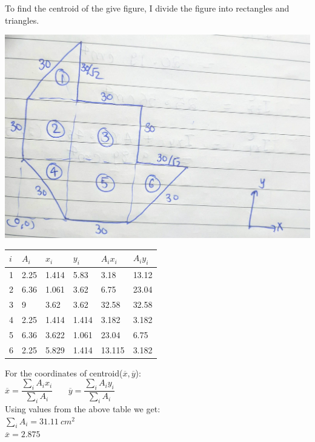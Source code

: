 \documentclass{article}
\begin{document}
To find the centroid of the give figure, I divide the figure into rectangles and triangles.\\
\begin{center}
\includegraphics[scale=0.1]{Q1.jpg}
\bigbreak

\begin{tabular}{ | m{1cm} | m{1cm}| m{1cm} | m{1cm} | m{1cm}| m{1cm}|} 
\hline
 $i$ & $A_i$ & $x_i$ & $y_i$ & $A_ix_i$ & $A_iy_i$\\ 
\hline
1 & 2.25 & 1.414 & 5.83 & 3.18 & 13.12 \\ 
\hline
2 & 6.36 & 1.061 & 3.62 & 6.75 & 23.04 \\  
\hline
3 & 9 & 3.62 & 3.62 & 32.58 & 32.58 \\ 
\hline
4 & 2.25 & 1.414 & 1.414 & 3.182 & 3.182 \\ 
\hline
5 & 6.36 & 3.622 & 1.061 & 23.04 & 6.75 \\ 
\hline
6 & 2.25 & 5.829 & 1.414 & 13.115 & 3.182 \\ 
\hline
\end{tabular}
\end{center}

\noindent For the coordinates of centroid($\overline{x},\overline{y} $): \\
$\overline{x} =\dfrac{\sum_i A_ix_i}{\sum_i A_i}$ \ \ \ $\overline{y} =\dfrac{\sum_i A_iy_i}{\sum_i A_i}$\\

\noindent Using values from the above table we get:\\ 

\noindent$\sum_i A_i=31.11 \ cm^2$\\

\noindent $\overline{x} = 2.875$
\end{document}
